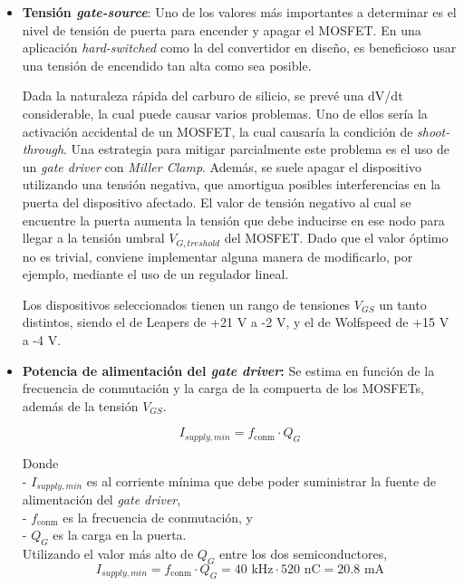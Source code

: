 \begin{itemize}
	
	\item \textbf{Tensión \textit{gate-source}}: Uno de los valores más importantes a determinar es el nivel de tensión de puerta para encender y apagar el MOSFET. En una aplicación \textit{hard-switched} como la del convertidor en diseño, es beneficioso usar una tensión de encendido tan alta como sea posible.
	
	Dada la naturaleza rápida del carburo de silicio, se prevé una dV/dt considerable, la cual puede causar varios problemas. Uno de ellos sería la activación accidental de un MOSFET, la cual causaría la condición de \textit{shoot-through}. Una estrategia para mitigar parcialmente este problema es el uso de un \textit{gate driver} con \textit{Miller Clamp}. Además, se suele apagar el dispositivo utilizando una tensión negativa, que amortigua posibles interferencias en la puerta del dispositivo afectado. El valor de tensión negativo al cual se encuentre la puerta aumenta la tensión que debe inducirse en ese nodo para llegar a la tensión umbral $V_{G,treshold}$ del MOSFET. Dado que el valor óptimo no es trivial, conviene implementar alguna manera de modificarlo, por ejemplo, mediante el uso de un regulador lineal.
	
	Los dispositivos seleccionados tienen un rango de tensiones $V_{GS}$ un tanto distintos, siendo el de Leapers de +21 V a -2 V, y el de Wolfspeed de +15 V a -4 V.
	
	\item \textbf{Potencia de alimentación del \textit{gate driver}:} Se estima en función de la frecuencia de conmutación y la carga de la compuerta de los MOSFETs, además de la tensión $V_{GS}$.
	
	\begin{equation}
	I_{supply, min} = f_{\text{conm}} \cdot Q_G
	\end{equation}
	
	Donde\\
	- \( I_{supply, min} \) es al corriente mínima que debe poder suministrar la fuente de alimentación del \textit{gate driver},\\
	- \( f_{\text{conm}} \) es la frecuencia de conmutación, y\\
	- \( Q_G \) es la carga en la puerta.\\
	
	Utilizando el valor más alto de $Q_G$ entre los dos semiconductores,
	\[
	I_{supply, min} = f_{\text{conm}}\cdot Q_G = 40 \text{ kHz} \cdot 520 \text{ nC} = 20.8 \text{ mA}
	\]
	

\end{itemize}
